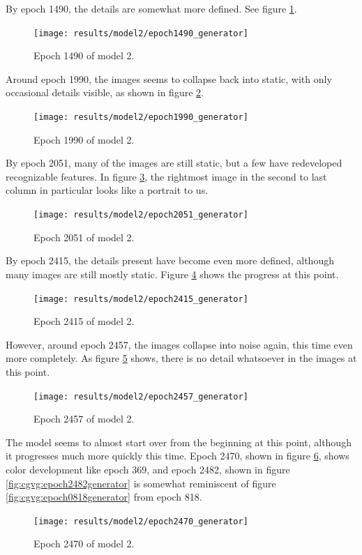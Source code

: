 \documentclass[11pt,letterpaper]{article}
\begin{document}
				By epoch 1490, the details are somewhat more defined.
				See figure \ref{fig:cgvg:epoch1490generator}.
				\begin{figure}
					\centering
					\texttt{[image: results/model2/epoch1490\_generator]}
					\caption{Epoch 1490 of model 2.}
					\label{fig:cgvg:epoch1490generator}
				\end{figure}

				Around epoch 1990, the images seems to collapse back into static, with only occasional details visible, as shown in figure \ref{fig:cgvg:epoch1990generator}.
				\begin{figure}
					\centering
					\texttt{[image: results/model2/epoch1990\_generator]}
					\caption{Epoch 1990 of model 2.}
					\label{fig:cgvg:epoch1990generator}
				\end{figure}

				By epoch 2051, many of the images are still static, but a few have redeveloped recognizable features.
				In figure \ref{fig:cgvg:epoch2051generator}, the rightmost image in the second to last column in particular looks like a portrait to us.
				\begin{figure}
					\centering
					\texttt{[image: results/model2/epoch2051\_generator]}
					\caption{Epoch 2051 of model 2.}
					\label{fig:cgvg:epoch2051generator}
				\end{figure}

				By epoch 2415, the details present have become even more defined, although many images are still mostly static.
				Figure \ref{fig:cgvg:epoch2415generator} shows the progress at this point.
				\begin{figure}
					\centering
					\texttt{[image: results/model2/epoch2415\_generator]}
					\caption{Epoch 2415 of model 2.}
					\label{fig:cgvg:epoch2415generator}
				\end{figure}

				However, around epoch 2457, the images collapse into noise again, this time even more completely.
				As figure \ref{fig:cgvg:epoch2457generator} shows, there is no detail whatsoever in the images at this point.
				\begin{figure}
					\centering
					\texttt{[image: results/model2/epoch2457\_generator]}
					\caption{Epoch 2457 of model 2.}
					\label{fig:cgvg:epoch2457generator}
				\end{figure}

				The model seems to almost start over from the beginning at this point, although it progresses much more quickly this time.
				Epoch 2470, shown in figure \ref{fig:cgvg:epoch2470generator}, shows color development like epoch 369, and epoch 2482, shown in figure \ref{fig:cgvg:epoch2482generator} is somewhat reminiscent of figure \ref{fig:cgvg:epoch0818generator} from epoch 818.
				\begin{figure}
					\centering
					\texttt{[image: results/model2/epoch2470\_generator]}
					\caption{Epoch 2470 of model 2.}
					\label{fig:cgvg:epoch2470generator}
				\end{figure}
\end{document}
